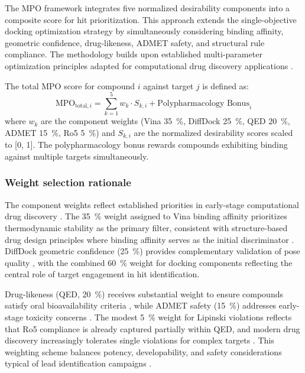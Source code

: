 \documentclass[journal=jcisd8,manuscript=suppinfo]{achemso}
\begin{document}
The MPO framework integrates five normalized desirability components into a composite score for hit prioritization. This approach extends the single-objective docking optimization strategy by simultaneously considering binding affinity, geometric confidence, drug-likeness, ADMET safety, and structural rule compliance. The methodology builds upon established multi-parameter optimization principles adapted for computational drug discovery applications \cite{Hughes2008, Gleeson2008}.

The total MPO score for compound $i$ against target $j$ is defined as:
\begin{equation}
\text{MPO}_{\text{total}, i} = \sum_{k=1}^{5} w_k \cdot S_{k,i} + \text{Polypharmacology Bonus}_i
\label{eq:mpo_total}
\end{equation}
where $w_k$ are the component weights (Vina \qty{35}{\percent}, DiffDock \qty{25}{\percent}, QED \qty{20}{\percent}, ADMET \qty{15}{\percent}, Ro5 \qty{5}{\percent}) and $S_{k,i}$ are the normalized desirability scores scaled to [\num{0}, \num{1}]. The polypharmacology bonus rewards compounds exhibiting binding against multiple targets simultaneously.

\subsubsection*{Weight selection rationale}

The component weights reflect established priorities in early-stage computational drug discovery \cite{Hughes2008, Gleeson2008}. The \qty{35}{\percent} weight assigned to Vina binding affinity prioritizes thermodynamic stability as the primary filter, consistent with structure-based drug design principles where binding affinity serves as the initial discriminator \cite{Trott2009}. DiffDock geometric confidence (\qty{25}{\percent}) provides complementary validation of pose quality \cite{Corso2023}, with the combined \qty{60}{\percent} weight for docking components reflecting the central role of target engagement in hit identification.

Drug-likeness (QED, \qty{20}{\percent}) receives substantial weight to ensure compounds satisfy oral bioavailability criteria \cite{Lipinski2004}, while ADMET safety (\qty{15}{\percent}) addresses early-stage toxicity concerns \cite{Swanson2024}. The modest \qty{5}{\percent} weight for Lipinski violations reflects that Ro5 compliance is already captured partially within QED, and modern drug discovery increasingly tolerates single violations for complex targets \cite{Hughes2008}. This weighting scheme balances potency, developability, and safety considerations typical of lead identification campaigns \cite{Gleeson2008}.
\end{document}
